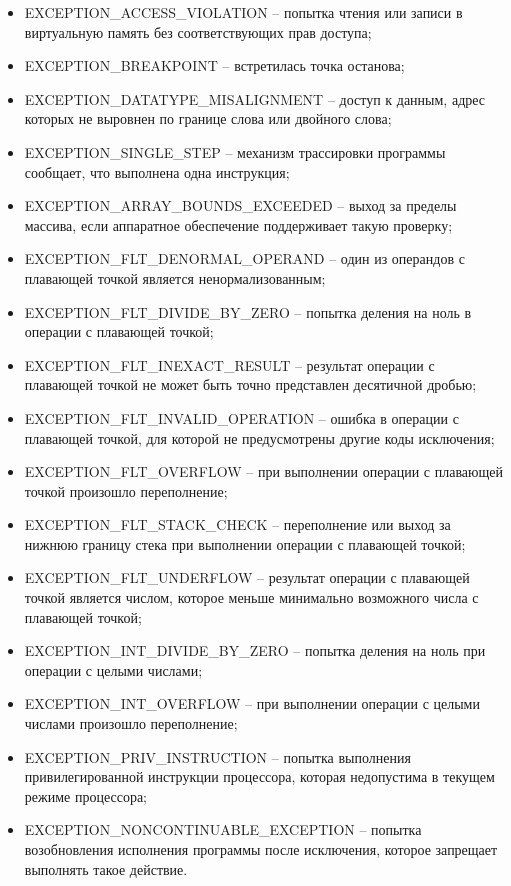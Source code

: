 \documentclass[14pt,a4paper,report]{report}
\begin{document}
\begin{itemize}
	\item EXCEPTION\_ACCESS\_VIOLATION -- попытка чтения или записи в виртуальную память без соответствующих прав доступа;
	\item EXCEPTION\_BREAKPOINT -- встретилась точка останова;
	\item EXCEPTION\_DATATYPE\_MISALIGNMENT -- доступ к данным, адрес которых не выровнен по границе слова или двойного слова;
	\item EXCEPTION\_SINGLE\_STEP -- механизм трассировки программы сообщает, что выполнена одна инструкция;
	\item EXCEPTION\_ARRAY\_BOUNDS\_EXCEEDED -- выход за пределы массива, если аппаратное обеспечение поддерживает такую проверку;
	\item EXCEPTION\_FLT\_DENORMAL\_OPERAND -- один из операндов с плавающей точкой является ненормализованным;
	\item EXCEPTION\_FLT\_DIVIDE\_BY\_ZERO -- попытка деления на ноль в операции с плавающей точкой;
	\item EXCEPTION\_FLT\_INEXACT\_RESULT -- результат операции с плавающей точкой не может быть точно представлен десятичной дробью;
	\item EXCEPTION\_FLT\_INVALID\_OPERATION -- ошибка в операции с плавающей точкой, для которой не предусмотрены другие коды исключения;
	\item EXCEPTION\_FLT\_OVERFLOW -- при выполнении операции с плавающей точкой произошло переполнение;
	\item EXCEPTION\_FLT\_STACK\_CHECK -- переполнение или выход за нижнюю границу стека при выполнении операции с плавающей точкой;
	\item EXCEPTION\_FLT\_UNDERFLOW -- результат операции с плавающей точкой является числом, которое меньше минимально возможного числа с плавающей точкой;
	\item EXCEPTION\_INT\_DIVIDE\_BY\_ZERO -- попытка деления на ноль при операции с целыми числами;
	\item EXCEPTION\_INT\_OVERFLOW -- при выполнении операции с целыми числами произошло переполнение;	
	\item EXCEPTION\_PRIV\_INSTRUCTION -- попытка выполнения привилегированной инструкции процессора, которая недопустима в текущем режиме процессора;
	\item EXCEPTION\_NONCONTINUABLE\_EXCEPTION -- попытка возобновления исполнения программы после исключения, которое запрещает выполнять такое действие.
\end{itemize}
\end{document}
